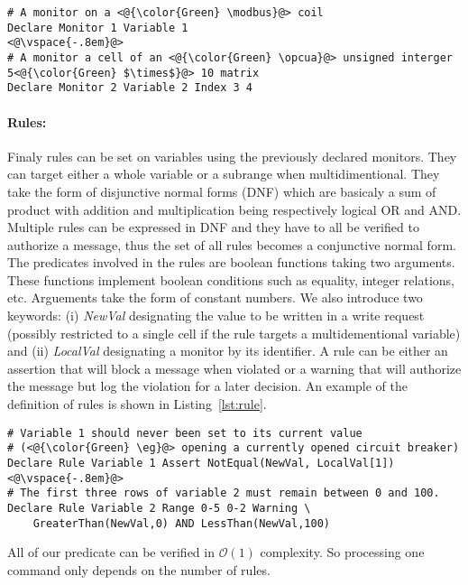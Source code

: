 \begin{lstlisting}[label=lst:mon,caption=Monitor definition example]
# A monitor on a <@{\color{Green} \modbus}@> coil
Declare Monitor 1 Variable 1
<@\vspace{-.8em}@>
# A monitor a cell of an <@{\color{Green} \opcua}@> unsigned interger 5<@{\color{Green} $\times$}@> 10 matrix
Declare Monitor 2 Variable 2 Index 3 4
\end{lstlisting}

\paragraph{Rules:} Finaly rules can be set on variables using the previously
declared monitors.
They can target either a whole variable or a subrange when multidimentional.
They take the form of disjunctive normal forms (DNF) which are basicaly a sum of
product with addition and multiplication being respectively logical OR and AND.
Multiple rules can be expressed in DNF and they have to all be verified to 
authorize a message, thus the set of all rules becomes a conjunctive normal
form.
The predicates involved in the rules are boolean functions taking two arguments.
These functions implement boolean conditions such as equality, integer
relations, etc.
Arguements take the form of constant numbers.
We also introduce two keywords: (i) {\em NewVal} designating the value to be
written in a write request (possibly restricted to a single cell if the rule
targets a multidementional variable) and (ii) {\em LocalVal} designating a
monitor by its identifier.
A rule can be either an assertion that will block a message when violated or a
warning that will authorize the message but log the violation for a later
decision.
An example of the definition of rules is shown in Listing~\ref{lst:rule}.

\begin{lstlisting}[label=lst:rule,caption=Rule definition example]
# Variable 1 should never been set to its current value
# (<@{\color{Green} \eg}@> opening a currently opened circuit breaker)
Declare Rule Variable 1 Assert NotEqual(NewVal, LocalVal[1])
<@\vspace{-.8em}@>
# The first three rows of variable 2 must remain between 0 and 100.
Declare Rule Variable 2 Range 0-5 0-2 Warning \
    GreaterThan(NewVal,0) AND LessThan(NewVal,100)
\end{lstlisting}

All of our predicate can be verified in $\mathcal{O}(1)$ complexity.
So processing one command only depends on the number of rules.

